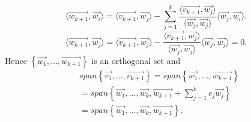 \documentclass{report}
\begin{document}
{     \[
     \langle \vec{ w_{k+1}} , \vec{ w_i}   \rangle = \langle \vec{ v_{k+1}}, \vec{ w_j} \rangle - \sum\limits_{j=1}^{k} \frac{ \langle \vec{ v_{k+1}}, \vec{ w_j}    \rangle   }{ \langle \vec{ w_j} , \vec{ w_j}   \rangle  } \langle \vec{ w_j} ,\vec{ w_i}   \rangle
     .\] 
     \[
     \langle \vec{ w_{k+1}} , \vec{ w_j}   \rangle = \langle  \vec{ v_{k+1}} , \vec{ w_j}    \rangle - \frac{ \langle \vec{ v_{k+1}}, \vec{ w_j}    \rangle   }{ \langle \vec{ w_j} , \vec{ w_j}   \rangle  } \langle \vec{ w_j} ,\vec{ w_j}   \rangle =0
     .\] 
     Hence $ \left\{ \vec{ w_1} , \ldots , \vec{ w _{ k+1}}  \right\} $ is an orthogonal set and 
     \begin{align*}
      & span \left\{ \vec{ v_1} , \ldots , \vec{ v_{k+1}}  \right\} = span \left\{ \vec{ w_1} , \ldots , \vec{ w_{k+1}}  \right\} \\
      &= span \left\{ \vec{ w_1} , \ldots , \vec{ w_k}  , \vec{ w_{k+1}}  + \sum\limits_{j=1}^{k} c_j \vec{ w_j}  \right\} \\
      &= span \left\{ \vec{ w_1} , \ldots , \vec{ w_k}  , \vec{ w_{k+1}}  \right\}
     .\end{align*}
     }
\end{document}
